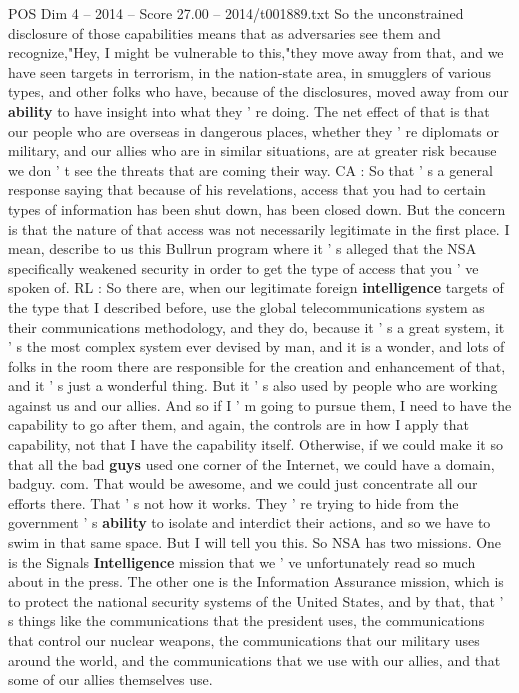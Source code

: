 \begin{textsample}{POS Dim 4 – 2014 – Score 27.00 – 2014/t001889.txt}
So the unconstrained disclosure of those capabilities means that as adversaries see them and recognize,"Hey, I might be vulnerable to this,"they move away from that, and we have seen targets in terrorism, in the nation-state area, in smugglers of various types, and other folks who have, because of the disclosures, moved away from our \textbf{ability} to have insight into what they ' re doing.
The net effect of that is that our people who are overseas in dangerous places, whether they ' re diplomats or military, and our allies who are in similar situations, are at greater risk because we don ' t see the threats that are coming their way.
CA : So that ' s a general response saying that because of his revelations, access that you had to certain types of information has been shut down, has been closed down.
But the concern is that the nature of that access was not necessarily legitimate in the first place.
I mean, describe to us this Bullrun program where it ' s alleged that the NSA specifically weakened security in order to get the type of access that you ' ve spoken of.
RL : So there are, when our legitimate foreign \textbf{intelligence} targets of the type that I described before, use the global telecommunications system as their communications methodology, and they do, because it ' s a great system, it ' s the most complex system ever devised by man, and it is a wonder, and lots of folks in the room there are responsible for the creation and enhancement of that, and it ' s just a wonderful thing.
But it ' s also used by people who are working against us and our allies.
And so if I ' m going to pursue them, I need to have the capability to go after them, and again, the controls are in how I apply that capability, not that I have the capability itself.
Otherwise, if we could make it so that all the bad \textbf{guys} used one corner of the Internet, we could have a domain, badguy. com.
That would be awesome, and we could just concentrate all our efforts there.
That ' s not how it works.
They ' re trying to hide from the government ' s \textbf{ability} to isolate and interdict their actions, and so we have to swim in that same space.
But I will tell you this.
So NSA has two missions.
One is the Signals \textbf{Intelligence} mission that we ' ve unfortunately read so much about in the press.
The other one is the Information Assurance mission, which is to protect the national security systems of the United States, and by that, that ' s things like the communications that the president uses, the communications that control our nuclear weapons, the communications that our military uses around the world, and the communications that we use with our allies, and that some of our allies themselves use.

\end{textsample}
